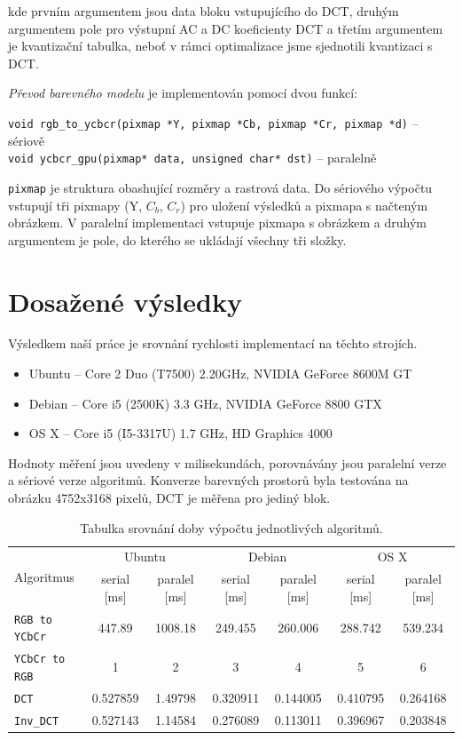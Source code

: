 \documentclass[11pt,a4paper]{article}
\begin{document}
kde prvním argumentem jsou data bloku vstupujícího do DCT, druhým argumentem pole pro výstupní AC a DC koeficienty DCT
a třetím argumentem je kvantizační tabulka, neboť v rámci optimalizace jsme sjednotili kvantizaci s DCT.

\textit{Převod barevného modelu} je implementován pomocí dvou funkcí:

\vspace{0.5em}
\hspace{-1.5em}\texttt{void rgb\_to\_ycbcr(pixmap *Y, pixmap *Cb, pixmap *Cr, pixmap *d)} -- sériově\\
\texttt{void ycbcr\_gpu(pixmap* data, unsigned char* dst)} -- paralelně
\vspace{0.5em}

\texttt{pixmap} je struktura obashující rozměry a rastrová data. Do sériového výpočtu vstupují tři pixmapy (Y, $C_b$, $C_r$) pro uložení výsledků a pixmapa s načteným obrázkem. V paralelní implementaci vstupuje pixmapa s obrázkem a druhým argumentem je pole, do kterého se ukládají všechny tři složky. 

\section{Dosažené výsledky}
Výsledkem naší práce je srovnání rychlosti implementací na těchto strojích.
\begin{itemize}
\item Ubuntu -- Core 2 Duo (T7500) 2.20GHz, NVIDIA GeForce 8600M GT
\item Debian -- Core i5 (2500K) 3.3 GHz, NVIDIA GeForce 8800 GTX
\item OS X -- Core i5 (I5-3317U) 1.7 GHz, HD Graphics 4000
\end{itemize}
Hodnoty měření jsou uvedeny v milisekundách, porovnávány jsou paralelní verze a sériové verze algoritmů.
Konverze barevných prostorů byla testována na obrázku 4752x3168 pixelů, DCT je měřena pro jediný blok.

\begin{table}[H]
\begin{center}
\renewcommand{\arraystretch}{1.3} %
\begin{tabular}{|l|cc|cc|cc|}\hline%
\multirow{2}{*}{Algoritmus}&\multicolumn{2}{|c|}{Ubuntu}&\multicolumn{2}{|c|}{Debian}&\multicolumn{2}{|c|}{OS X}\\
          &serial [ms]&paralel [ms]&serial [ms]&paralel [ms]&serial [ms]&paralel [ms]\\\hline%
\texttt{RGB to YCbCr}&447.89&1008.18&249.455&260.006&288.742&539.234\\
\texttt{YCbCr to RGB}&1&2&3&4&5&6\\
\texttt{DCT}         &0.527859&1.49798&0.320911&0.144005&0.410795&0.264168\\
\texttt{Inv\_DCT}    &0.527143&1.14584&0.276089&0.113011&0.396967&0.203848\\
\hline
\end{tabular}
\renewcommand{\arraystretch}{1} %
\end{center}
\caption{Tabulka srovnání doby výpočtu jednotlivých algoritmů.}
\label{ps_history}
\end{table}
\end{document}

